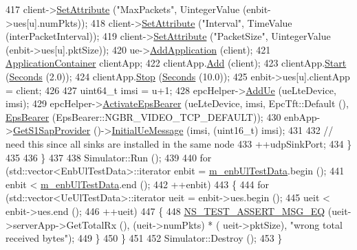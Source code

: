 \begin{DoxyCode}
417           client->\hyperlink{classns3_1_1ObjectBase_ac60245d3ea4123bbc9b1d391f1f6592f}{SetAttribute} (\textcolor{stringliteral}{"MaxPackets"}, UintegerValue (enbit->ues[u].numPkts));
418           client->\hyperlink{classns3_1_1ObjectBase_ac60245d3ea4123bbc9b1d391f1f6592f}{SetAttribute} (\textcolor{stringliteral}{"Interval"}, TimeValue (interPacketInterval));
419           client->\hyperlink{classns3_1_1ObjectBase_ac60245d3ea4123bbc9b1d391f1f6592f}{SetAttribute} (\textcolor{stringliteral}{"PacketSize"}, UintegerValue (enbit->ues[u].pktSize));
420           ue->\hyperlink{classns3_1_1Node_ab98b4fdc4aadc86366b80e8a79a53f47}{AddApplication} (client);
421           \hyperlink{classns3_1_1ApplicationContainer}{ApplicationContainer} clientApp;
422           clientApp.\hyperlink{classns3_1_1ApplicationContainer_ad09ab1a1ad5849d518d5f4c262e38152}{Add} (client);
423           clientApp.\hyperlink{classns3_1_1ApplicationContainer_a8eff87926507020bbe3e1390358a54a7}{Start} (\hyperlink{group__timecivil_ga33c34b816f8ff6628e33d5c8e9713b9e}{Seconds} (2.0));
424           clientApp.\hyperlink{classns3_1_1ApplicationContainer_adfc52f9aa4020c8714679b00bbb9ddb3}{Stop} (\hyperlink{group__timecivil_ga33c34b816f8ff6628e33d5c8e9713b9e}{Seconds} (10.0));   
425           enbit->ues[u].clientApp = client;
426 
427           uint64\_t imsi = u+1;
428           epcHelper->\hyperlink{classns3_1_1PointToPointEpcHelper_a6ed801de21387477fabd23eeafff7e73}{AddUe} (ueLteDevice, imsi);
429           epcHelper->\hyperlink{classns3_1_1PointToPointEpcHelper_a97023077eae8644e8f1b269a357c8f93}{ActivateEpsBearer} (ueLteDevice, imsi, EpcTft::Default (), 
      \hyperlink{structns3_1_1EpsBearer}{EpsBearer} (EpsBearer::NGBR\_VIDEO\_TCP\_DEFAULT));
430           enbApp->\hyperlink{classns3_1_1EpcEnbApplication_a706b531d6ec3ab6eb37567232f5c6cd4}{GetS1SapProvider} ()->\hyperlink{classns3_1_1EpcEnbS1SapProvider_af5e1397f498eb5b2b2e84d8a41106cac}{InitialUeMessage} (imsi, (uint16\_t) 
      imsi);
431           
432           \textcolor{comment}{// need this since all sinks are installed in the same node}
433           ++udpSinkPort; 
434         \} 
435             
436     \} 
437   
438   Simulator::Run ();
439 
440   \textcolor{keywordflow}{for} (std::vector<EnbUlTestData>::iterator enbit = \hyperlink{classEpcS1uUlTestCase_a2d52c6d9f4ee886f2060016760d7bf4d}{m\_enbUlTestData}.begin ();
441        enbit < \hyperlink{classEpcS1uUlTestCase_a2d52c6d9f4ee886f2060016760d7bf4d}{m\_enbUlTestData}.end ();
442        ++enbit)
443     \{
444       \textcolor{keywordflow}{for} (std::vector<UeUlTestData>::iterator ueit = enbit->ues.begin ();
445            ueit < enbit->ues.end ();
446            ++ueit)
447         \{
448           \hyperlink{group__testing_ga2a9d78cffb3db8e867c35fff0b698cf5}{NS\_TEST\_ASSERT\_MSG\_EQ} (ueit->serverApp->GetTotalRx (), (ueit->numPkts) * (
      ueit->pktSize), \textcolor{stringliteral}{"wrong total received bytes"});
449         \}      
450     \}
451   
452   Simulator::Destroy ();
453 \}
\end{DoxyCode}


